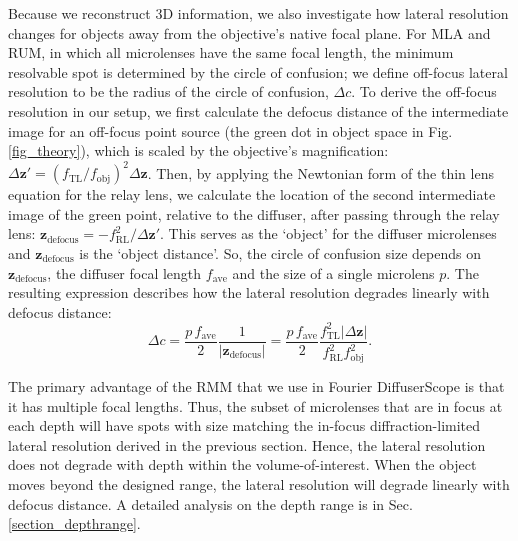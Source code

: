 \documentclass{osa-article}
\begin{document}
Because we reconstruct 3D information, we also investigate how lateral resolution changes for objects away from the objective's native focal plane. For MLA and RUM, in which all microlenses have the same focal length, the minimum resolvable spot is determined by the circle of confusion; we define off-focus lateral resolution to be the radius of the circle of confusion, $\Delta c$. To derive the off-focus resolution in our setup, we first calculate the defocus distance of the intermediate image for an off-focus point source (the green dot in object space in Fig. \ref{fig_theory}), which is scaled by the objective's magnification: $\Delta \mathbf{z}' = ( f_\mathrm{TL} / f_\mathrm{obj} )^2 \Delta \mathbf{z}$. Then, by applying the Newtonian form of the thin lens equation for the relay lens, we calculate the location of the second intermediate image of the green point, relative to the diffuser, after passing through the relay lens:  $ \mathbf{z}_\mathrm{defocus} = -f_\mathrm{RL}^2 /\Delta \mathbf{z}'$. This serves as the `object' for the diffuser microlenses and $\mathbf{z}_\mathrm{defocus}$ is the `object distance'. So, the circle of confusion size depends on $\mathbf{z}_\mathrm{defocus}$, the diffuser focal length $f_{\mathrm{ave}}$ and the size of a single microlens $p$. The resulting expression describes how the lateral resolution degrades linearly with defocus distance:
\begin{equation}
\label{eq_circle_confusion}
\Delta c=  \frac{p \, f_{\mathrm{ave}}}{2}   \frac{1}{| \mathbf{z}_\mathrm{defocus} |} = \frac{p \, f_{\mathrm{ave}}}{2}   \frac{f_\mathrm{TL} ^2 |\Delta \mathbf{z} |} { f_\mathrm{RL}^2 f_\mathrm{obj}^2} .
\end{equation}

The primary advantage of the RMM that we use in Fourier DiffuserScope is that it has multiple focal lengths. Thus, the subset of microlenses that are in focus at each depth will have spots with size matching the in-focus diffraction-limited lateral resolution derived in the previous section. Hence, the lateral resolution does not degrade with depth within the volume-of-interest. When the object moves beyond the designed range, the lateral resolution will degrade linearly with defocus distance.  A detailed analysis on the depth range is in Sec. \ref{section_depthrange}.
\end{document}
